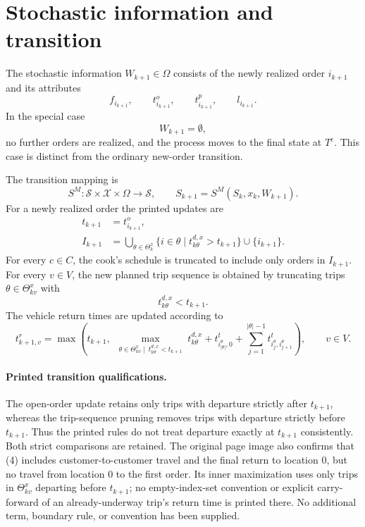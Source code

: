 \documentclass{article}
\begin{document}
\section*{Stochastic information and transition}

The stochastic information \(W_{k+1}\in\Omega\) consists of the newly realized order \(i_{k+1}\) and its attributes
\[
f_{i_{k+1}},\qquad t^o_{i_{k+1}},\qquad
 t^p_{i_{k+1}},\qquad l_{i_{k+1}}.
\]
In the special case
\[
W_{k+1}=\emptyset,
\]
no further orders are realized, and the process moves to the final state at \(T^c\). This case is distinct from the ordinary new-order transition.

The transition mapping is
\[
S^M:\mathcal{S}\times\mathcal{X}\times\Omega\longrightarrow\mathcal{S},
\qquad
S_{k+1}=S^M(S_k,x_k,W_{k+1}).
\]
For a newly realized order the printed updates are
\begin{align*}
t_{k+1}&=t^o_{i_{k+1}},\\
I_{k+1}&=
\bigcup_{\theta\in\Theta^x_k}
\{i\in\theta\mid t^{d,x}_{k\theta}>t_{k+1}\}
\cup\{i_{k+1}\}.
\end{align*}
For every \(c\in C\), the cook's schedule is truncated to include only orders in \(I_{k+1}\). For every \(v\in V\), the new planned trip sequence is obtained by truncating trips \(\theta\in\Theta^x_{kv}\) with
\[
t^{d,x}_{k\theta}<t_{k+1}.
\]
The vehicle return times are updated according to
\begin{equation}
t^r_{k+1,v}
=\max\left(
 t_{k+1},\
 \max_{\substack{\theta\in\Theta^x_{kv}\mid\ t^{d,x}_{k\theta}<t_{k+1}}}
 t^{d,x}_{k\theta}
 +t^t_{i^\theta_{|\theta|},0}
 +\sum_{j=1}^{|\theta|-1}t^t_{i^\theta_j,i^\theta_{j+1}}
\right),\qquad v\in V.
\tag{4}
\end{equation}

\paragraph{Printed transition qualifications.}
The open-order update retains only trips with departure strictly after \(t_{k+1}\), whereas the trip-sequence pruning removes trips with departure strictly before \(t_{k+1}\). Thus the printed rules do not treat departure exactly at \(t_{k+1}\) consistently. Both strict comparisons are retained. The original page image also confirms that (4) includes customer-to-customer travel and the final return to location \(0\), but no travel from location \(0\) to the first order. Its inner maximization uses only trips in \(\Theta^x_{kv}\) departing before \(t_{k+1}\); no empty-index-set convention or explicit carry-forward of an already-underway trip's return time is printed there. No additional term, boundary rule, or convention has been supplied.
\end{document}
